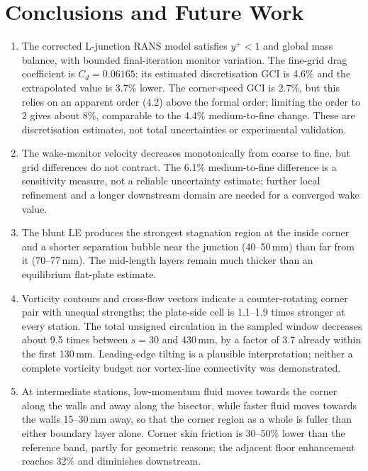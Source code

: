 \documentclass[12pt,a4paper,oneside]{report}
\newcommand{\Cd}{C_d}
\begin{document}
\chapter{Conclusions and Future Work}
\begin{enumerate}[label=\arabic*.,leftmargin=*,itemsep=6pt]
\item The corrected L-junction RANS model satisfies $y^+ < 1$ and global mass balance, with bounded final-iteration monitor variation. The fine-grid drag coefficient is $\Cd = 0.06165$; its estimated discretisation GCI is 4.6\% and the extrapolated value is 3.7\% lower. The corner-speed GCI is 2.7\%, but this relies on an apparent order (4.2) above the formal order; limiting the order to 2 gives about 8\%, comparable to the 4.4\% medium-to-fine change. These are discretisation estimates, not total uncertainties or experimental validation.
\item The wake-monitor velocity decreases monotonically from coarse to fine, but grid differences do not contract. The 6.1\% medium-to-fine difference is a sensitivity measure, not a reliable uncertainty estimate; further local refinement and a longer downstream domain are needed for a converged wake value.
\item The blunt LE produces the strongest stagnation region at the inside corner and a shorter separation bubble near the junction (40--50\,mm) than far from it (70--77\,mm). The mid-length layers remain much thicker than an equilibrium flat-plate estimate.
\item Vorticity contours and cross-flow vectors indicate a counter-rotating corner pair with unequal strengths; the plate-side cell is 1.1--1.9 times stronger at every station. The total unsigned circulation in the sampled window decreases about 9.5 times between $s = 30$ and 430\,mm, by a factor of 3.7 already within the first 130\,mm. Leading-edge tilting is a plausible interpretation; neither a complete vorticity budget nor vortex-line connectivity was demonstrated.
\item At intermediate stations, low-momentum fluid moves towards the corner along the walls and away along the bisector, while faster fluid moves towards the walls 15--30\,mm away, so that the corner region as a whole is fuller than either boundary layer alone. Corner skin friction is 30--50\% lower than the reference band, partly for geometric reasons; the adjacent floor enhancement reaches 32\% and diminishes downstream.
\end{enumerate}
\end{document}
